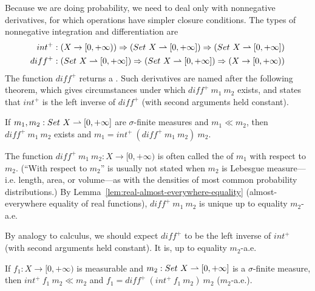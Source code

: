 Because we are doing probability, we need to deal only with nonnegative derivatives, for which operations have simpler closure conditions.
The types of nonnegative integration and differentiation are
\begin{equation}
\begin{aligned}
	int^+ &: (X \to [0,+\infty)) \Rightarrow (Set~X \rightharpoonup [0,+\infty]) \Rightarrow (Set~X \rightharpoonup [0,+\infty]) \\
	diff^+ &: (Set~X \rightharpoonup [0,+\infty]) \Rightarrow (Set~X \rightharpoonup [0,+\infty]) \Rightarrow (X \to [0,+\infty))
\end{aligned}
\label{eqn:int-diff-types}
\end{equation}
The function $diff^+$ returns a .
Such derivatives are named after the following theorem, which gives circumstances under which $diff^+~m_1~m_2$ exists, and states that $int^+$ is the left inverse of $diff^+$ (with second arguments held constant).

\begin{lemma}
\label{lem:radon-nikodym}
If $m_1,m_2 : Set~X \rightharpoonup [0,+\infty]$ are $\sigma$-finite measures and $m_1 \ll m_2$, then $diff^+~m_1~m_2$ exists and $m_1 = int^+~(diff^+~m_1~m_2)~m_2$.
\end{lemma}

The function $diff^+~m_1~m_2 : X \to [0,+\infty)$ is often called the  of $m_1$ with respect to $m_2$.
(``With respect to $m_2$'' is usually not stated when $m_2$ is Lebesgue measure---i.e. length, area, or volume---as with the densities of most common probability distributions.)
By Lemma~\ref{lem:real-almost-everywhere-equality} (almost-everywhere equality of real functions), $diff^+~m_1~m_2$ is unique up to equality $m_2$-a.e.

By analogy to calculus, we should expect $diff^+$ to be the left inverse of $int^+$ (with second arguments held constant).
It is, up to equality $m_2$-a.e.
\begin{lemma}
\label{lem:diff-left-inverse-int}
If $f_1 : X \to [0,+\infty)$ is measurable and $m_2 : Set~X \rightharpoonup [0,+\infty]$ is a $\sigma$-finite measure, then $int^+~f_1~m_2 \ll m_2$ and $f_1 = diff^+~(int^+~f_1~m_2)~m_2$ ($m_2$-a.e.).
\end{lemma}
\begin{comment}
\begin{proof}
\begin{align*}
	&int~(f_1 - diff^+~(int^+~f_1~m_2)~m_2)~m_2
\\
	&\tab=\ int~f_1~m_2 - int~(diff^+~(int^+~f_1~m_2)~m_2)~m_2
\\
	&\tab=\ int^+~f_1~m_2 - int^+~(diff^+~(int^+~f_1~m_2)~m_2)~m_2
\\
	&\tab=\ int^+~f_1~m_2 - int^+~f_1~m_2
\end{align*}
\end{proof}
\end{comment}

